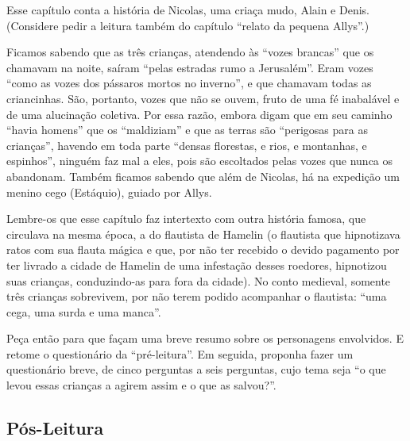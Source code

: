 \documentclass[12pt]{extarticle}
\begin{document}
Esse capítulo 
conta a história de Nicolas, uma criaça mudo, Alain e Denis. 
(Considere pedir a leitura também do capítulo “relato da pequena Allys”.) 
 
Ficamos sabendo que as três crianças, atendendo às “vozes brancas”
que os chamavam na noite, saíram “pelas estradas rumo a Jerusalém”.
Eram vozes “como as vozes dos pássaros mortos no inverno”, e que chamavam todas
as criancinhas. São, portanto, vozes que não se ouvem, fruto de uma fé
inabalável e de uma alucinação coletiva. Por essa razão, embora digam que em
seu caminho “havia homens” que os “maldiziam” e que as terras são “perigosas
para as crianças”, havendo em toda parte “densas florestas, e rios,
e montanhas, e espinhos”, ninguém faz mal a eles, pois são escoltados pelas
vozes que nunca os abandonam. Também ficamos sabendo que além de Nicolas, 
há na expedição um menino cego (Estáquio), guiado por Allys.
 
Lembre-os que esse capítulo faz intertexto com outra história famosa, que circulava na mesma
época, a do flautista de Hamelin (o flautista que hipnotizava ratos com sua
flauta mágica e que, por não ter recebido o devido pagamento por ter livrado
a cidade de Hamelin de uma infestação desses roedores, hipnotizou suas
crianças, conduzindo-as para fora da cidade). No conto medieval, somente três
crianças sobrevivem, por não terem podido acompanhar o flautista: “uma cega,
uma surda e uma manca”.
 
Peça então para que façam uma breve resumo sobre os personagens envolvidos. 
E retome o questionário da ``pré-leitura''. Em seguida, proponha fazer um 
questionário breve, de cinco perguntas a seis perguntas, cujo tema 
seja ``o que levou essas crianças a agirem assim e o que as salvou?''.


\subsection{Pós-Leitura}
\end{document}
